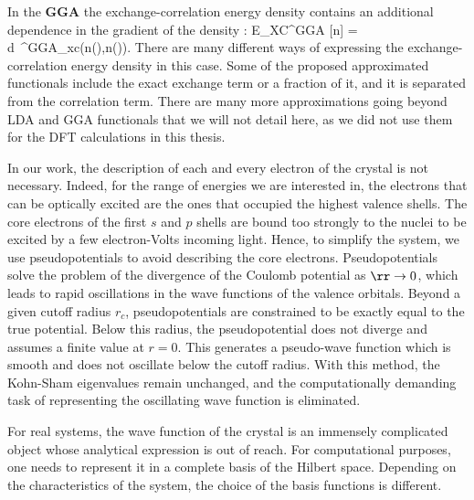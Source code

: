 In the \textbf{\gls{GGA}} the exchange-correlation energy density contains an additional dependence in the gradient of the density :
\be
 	E_{XC}^{GGA} [n] = \int d\rr \ \epsilon^{GGA}_{xc}(n(\rr),\nabla n(\rr)).
\ee
There are many different ways of expressing the exchange-correlation energy density in this case. Some of the proposed approximated functionals include the exact exchange term or a fraction of it, and it is separated from the correlation term.
There are many more approximations going beyond LDA and GGA functionals that we will not detail here, as we did not use them for the DFT calculations in this thesis.\newline

In our work, the description of each and every electron of the crystal is not necessary. Indeed, for the range of energies we are interested in, the electrons that can be optically excited are the ones that occupied the highest valence shells. The core electrons of the first $s$ and $p$ shells are bound too strongly to the nuclei to be excited by a few electron-Volts incoming light. Hence, to simplify the system, we use pseudopotentials to avoid describing the core electrons.
Pseudopotentials solve the problem of the divergence of the Coulomb potential as $\rr  \to 0$, which leads to rapid oscillations in the wave functions of the valence orbitals.
Beyond a given cutoff radius $r_c$, pseudopotentials are constrained to be exactly equal to the true
potential. Below this radius, the pseudopotential does not diverge and assumes a finite value at $r=0$. This generates a pseudo-wave function which is smooth and does not oscillate below the cutoff radius. With this method, the Kohn-Sham eigenvalues remain unchanged, and the computationally demanding task of representing the oscillating wave function is eliminated.\newline

For real systems, the wave function of the crystal is an immensely complicated object whose analytical expression is out of reach. For computational purposes, one needs to represent it in a complete basis of the Hilbert space. Depending on the characteristics of the system, the choice of the basis functions is different.

